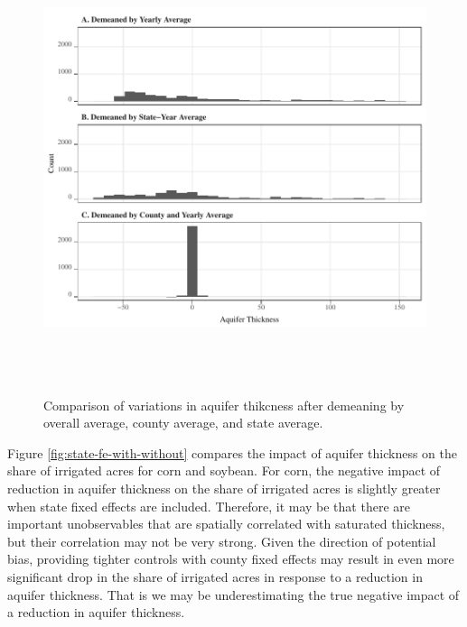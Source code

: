 \documentclass[
]{article}
\begin{document}
\begin{figure}[H]

{\centering \includegraphics[width=6in,height=500px,]{Figures/g_variation} 

}

\caption{Comparison of variations in aquifer thikcness after demeaning by overall average, county average, and state average.}\label{fig:variation-left}
\end{figure}

Figure \ref{fig:state-fe-with-without} compares the impact of aquifer thickness on the share of irrigated acres for corn and soybean. For corn, the negative impact of reduction in aquifer thickness on the share of irrigated acres is slightly greater when state fixed effects are included. Therefore, it may be that there are important unobservables that are spatially correlated with saturated thickness, but their correlation may not be very strong. Given the direction of potential bias, providing tighter controls with county fixed effects may result in even more significant drop in the share of irrigated acres in response to a reduction in aquifer thickness. That is we may be underestimating the true negative impact of a reduction in aquifer thickness.
\end{document}
